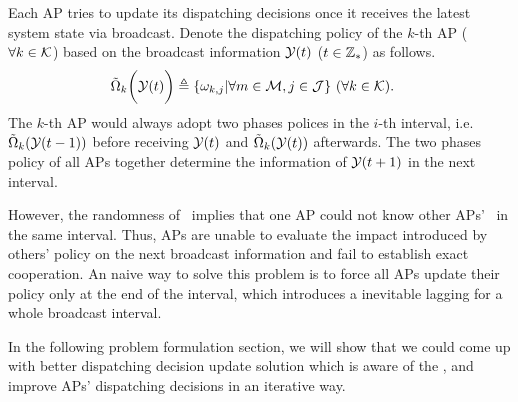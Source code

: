 Each AP tries to update its dispatching decisions once it receives the latest system state via broadcast.
Denote the dispatching policy of the $k$-th AP ($\forall k\in\mathcal{K}$) based on the broadcast information $\mathcal{Y}({t})$ ($t \in\mathbb{Z}_{*}$) as follows.
\begin{align}
    &\tilde{\Omega}_{k}\bigg(\mathcal{Y}({t})\bigg) \triangleq \{\omega_{k,j}|\forall m\in\mathcal{M}, j\in\mathcal{J}\}
    ~(\forall k\in\mathcal{K}).
    \label{def_action}
\end{align}
The $k$-th AP would always adopt two phases polices in the $i$-th interval, i.e. $\tilde{\Omega}_{k}(\mathcal{Y}({t-1}))$ before receiving $\mathcal{Y}({t})$ and $\tilde{\Omega}_{k}(\mathcal{Y}({t}))$ afterwards.
The two phases policy of all APs together determine the information of $\mathcal{Y}({t+1})$ in the next interval.

However, the randomness of \brdelay~implies that one AP could not know other APs' \brdelay~in the same interval.
Thus, APs are unable to evaluate the impact introduced by others' policy on the next broadcast information and fail to establish exact cooperation.
An naive way to solve this problem is to force all APs update their policy only at the end of the interval, which introduces a inevitable lagging for a whole broadcast interval.

In the following problem formulation section, we will show that we could come up with better dispatching decision update solution which is aware of the \brdelay, and improve APs' dispatching decisions in an iterative way.
